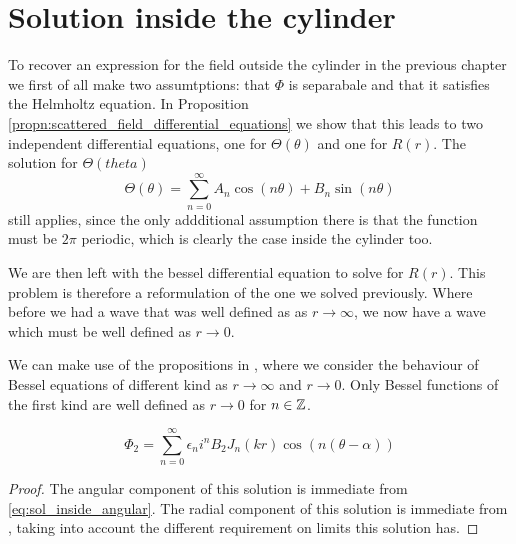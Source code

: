 %
%
\section{Solution inside the cylinder}

To recover an expression for the field outside the cylinder in the previous chapter we first of all make two assumtptions: that $\Phi$ is separabale and that it satisfies the Helmholtz equation. In Proposition \ref{propn:scattered_field_differential_equations} we show that this leads to two independent differential equations, one for $\Theta(\theta)$ and one for $R(r)$. The solution for $\Theta(theta)$
\begin{equation}\label{eq:sol_inside_angular}
  \Theta(\theta) = \sum_{n=0}^{\infty} A_n \cos(n\theta) + B_n \sin(n\theta)
\end{equation}
still applies, since the only addditional assumption there is that the function must be $2 \pi$ periodic, which is clearly the case inside the cylinder too.

We are then left with the bessel differential equation to solve for $R(r)$. This problem is therefore a reformulation of the one we solved previously. Where before we had a wave that was well defined as as $r\rightarrow\infty$, we now have a wave which must be well defined as $r\rightarrow 0$.

We can make use of the propositions in , where we consider the behaviour of Bessel equations of different kind as $r\rightarrow\infty$ and $r\rightarrow 0$. Only Bessel functions of the first kind are well defined as $r\rightarrow 0$ for $n\in \mathbb{Z}$.

\begin{propn}
\begin{equation}
  \Phi_2 = \sum_{n=0}^{\infty} \epsilon_n i^n B_2 J_n(kr) \cos(n(\theta-\alpha))
\end{equation}
\end{propn}
\begin{proof}
  The angular component of this solution is immediate from \eqref{eq:sol_inside_angular}. The radial component of this solution is immediate from \label{eq:gen_sol_scatterin_outside_cylinder}, taking into account the different requirement on limits this solution has.
\end{proof}

